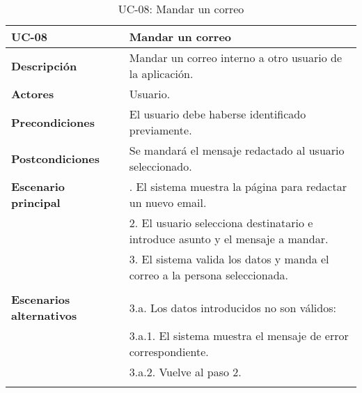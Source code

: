 \begin{table}[H]
  \begin{center}
    \begin{tabularx}{16.4cm}{|l|X|}
      \hline
      \textbf{UC-08} & \textbf{Mandar un correo}\\
      \hline
      \textbf{Descripción} & Mandar un correo interno a otro usuario de la aplicación.\\
      \hline
      \textbf{Actores} & Usuario.\\
      \hline
      \textbf{Precondiciones} & El usuario debe haberse identificado previamente.\\
      \hline
      \textbf{Postcondiciones} & Se mandará el mensaje redactado al usuario seleccionado.\\
      \hline
      \textbf{Escenario principal} & \smallskip 1. El sistema muestra la página para redactar un nuevo email.\\
      & 2. El usuario selecciona destinatario e introduce asunto y el mensaje a mandar.\\
      & 3. El sistema valida los datos y manda el correo a la persona seleccionada.\\
      & \\
      \hline
      \textbf{Escenarios alternativos} & \smallskip 3.a. Los datos introducidos no son válidos:\\
      & \hspace{0.3cm} 3.a.1. El sistema muestra el mensaje de error correspondiente.\\
      & \hspace{0.3cm} 3.a.2. Vuelve al paso 2.\\
      & \\
      \hline
    \end{tabularx}
    \caption{UC-08: Mandar un correo}
  \end{center}
\end{table}


